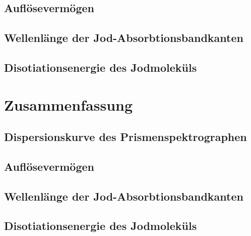 \documentclass[12pt,english,ngerman]{scrartcl}
\begin{document}
\subsection{Auflösevermögen}


\subsection{Wellenlänge der Jod-Absorbtionsbandkanten}


\subsection{Disotiationsenergie des Jodmoleküls}





\section{Zusammenfassung}\label{sec:zs}


\subsection{Dispersionskurve des Prismenspektrographen}


\subsection{Auflösevermögen}


\subsection{Wellenlänge der Jod-Absorbtionsbandkanten}


\subsection{Disotiationsenergie des Jodmoleküls}










\newpage

\printbibliography
\listoffigures
\listoftables
\end{document}
